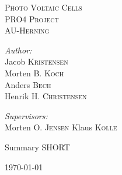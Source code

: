\begin{titlepage}

\begin{center}

\textsc{\LARGE Photo Voltaic Cells}\\[1.5cm]

\textsc{\Large PRO4 Project}\\[0.5cm]

\textsc{\Large AU-Herning}\\[0.5cm]


\begin{minipage}{0.4\textwidth}
\begin{flushleft} \large
\emph{Author:}\\
Jacob \textsc{Kristensen}\\
Morten \textsc{B. Koch}\\
Anders \textsc{Bech}\\
Henrik \textsc{H. Christensen}
\end{flushleft}
\end{minipage}
\begin{minipage}{0.4\textwidth}
\begin{flushright} \large
\emph{Supervisors:} \\
Morten \textsc{O. Jensen}
Klaus \textsc{Kolle}
\end{flushright}
\end{minipage}


\vfill

\begin{flushleft}
Summary SHORT
\end{flushleft}

{\large \today}

\end{center}

\end{titlepage}